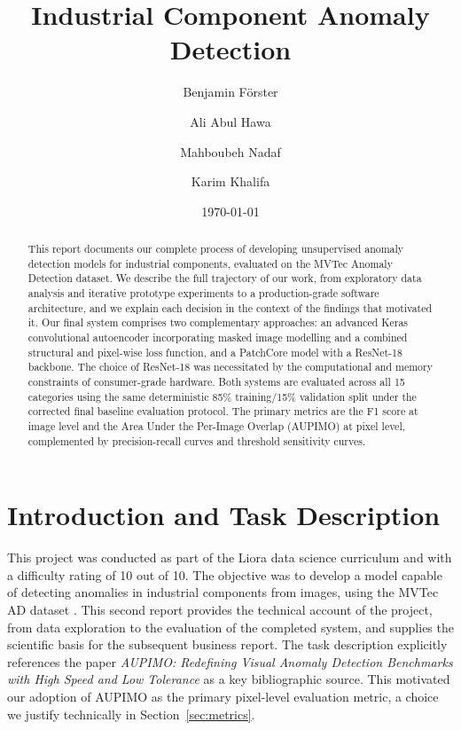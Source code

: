 \documentclass[11pt, a4paper]{article}
\title{
    \vspace{-1cm}
    {\LARGE Industrial Component Anomaly Detection}\\[0.5em]
}
\author{
    Benjamin F{\"o}rster \and
    Ali Abul Hawa \and
    Mahboubeh Nadaf \and
    Karim Khalifa
}
\date{\today}
\begin{document}
\maketitle
\thispagestyle{fancy}

\begin{abstract}
    This report documents our complete process of developing unsupervised anomaly detection models for industrial components, evaluated on the MVTec Anomaly Detection dataset. We describe the full trajectory of our work, from exploratory data analysis and iterative prototype experiments to a production-grade software architecture, and we explain each decision in the context of the findings that motivated it. Our final system comprises two complementary approaches: an advanced Keras convolutional autoencoder incorporating masked image modelling and a combined structural and pixel-wise loss function, and a PatchCore model with a ResNet-18 backbone. The choice of ResNet-18 was necessitated by the computational and memory constraints of consumer-grade hardware. Both systems are evaluated across all 15 categories using the same deterministic 85\% training/15\% validation split under the corrected final baseline evaluation protocol. The primary metrics are the F1 score at image level and the Area Under the Per-Image Overlap (AUPIMO) at pixel level, complemented by precision-recall curves and threshold sensitivity curves.
\end{abstract}


\section{Introduction and Task Description}
\label{sec:introduction}

This project was conducted as part of the Liora data science curriculum and with a difficulty rating of 10 out of 10. The objective was to develop a model capable of detecting anomalies in industrial components from images, using the MVTec AD dataset \cite{bergmann2019mvtec, bergmann2021mvtec}. This second report provides the technical account of the project, from data exploration to the evaluation of the completed system, and supplies the scientific basis for the subsequent business report. The task description explicitly references the paper \textit{AUPIMO: Redefining Visual Anomaly Detection Benchmarks with High Speed and Low Tolerance} \cite{bertoldo2024aupimo} as a key bibliographic source. This motivated our adoption of AUPIMO as the primary pixel-level evaluation metric, a choice we justify technically in Section~\ref{sec:metrics}.
\end{document}
